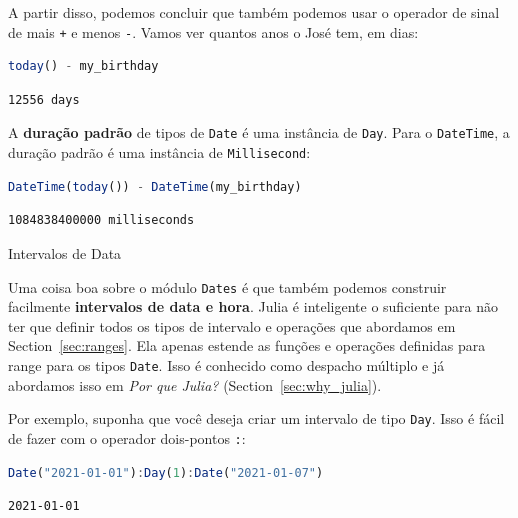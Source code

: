 \documentclass[
  notoc %
]{tufte-book}
\makeatletter
\newcommand{\passthrough}[1]{#1}
\renewcommand\subsubsection{%
\@startsection{subsubsection}{3}{\z@ }{-3.25ex\@plus -1ex \@minus -.2ex}{1.5ex \@plus .2ex}{\normalfont \normalsize \bfseries }
}
\makeatother
\begin{document}
A partir disso, podemos concluir que também podemos usar o operador de
sinal de mais \passthrough{\lstinline!+!} e menos
\passthrough{\lstinline!-!}. Vamos ver quantos anos o José tem, em dias:

\begin{lstlisting}[language=Julia]
today() - my_birthday
\end{lstlisting}

\begin{lstlisting}[language=Output]
12556 days
\end{lstlisting}

A \textbf{duração padrão} de tipos de \passthrough{\lstinline!Date!} é
uma instância de \passthrough{\lstinline!Day!}. Para o
\passthrough{\lstinline!DateTime!}, a duração padrão é uma instância de
\passthrough{\lstinline!Millisecond!}:

\begin{lstlisting}[language=Julia]
DateTime(today()) - DateTime(my_birthday)
\end{lstlisting}

\begin{lstlisting}[language=Output]
1084838400000 milliseconds
\end{lstlisting}

\hypertarget{sec:dates_intervals}{%
\subsubsection{Intervalos de Data}\label{sec:dates_intervals}}

Uma coisa boa sobre o módulo \passthrough{\lstinline!Dates!} é que
também podemos construir facilmente \textbf{intervalos de data e hora}.
Julia é inteligente o suficiente para não ter que definir todos os tipos
de intervalo e operações que abordamos em Section~\ref{sec:ranges}. Ela
apenas estende as funções e operações definidas para range para os tipos
\passthrough{\lstinline!Date!}. Isso é conhecido como despacho múltiplo
e já abordamos isso em \emph{Por que Julia?}
(Section~\ref{sec:why_julia}).

Por exemplo, suponha que você deseja criar um intervalo de tipo
\passthrough{\lstinline!Day!}. Isso é fácil de fazer com o operador
dois-pontos \passthrough{\lstinline!:!}:

\begin{lstlisting}[language=Julia]
Date("2021-01-01"):Day(1):Date("2021-01-07")
\end{lstlisting}

\begin{lstlisting}[language=Output]
2021-01-01
\end{lstlisting}
\end{document}

